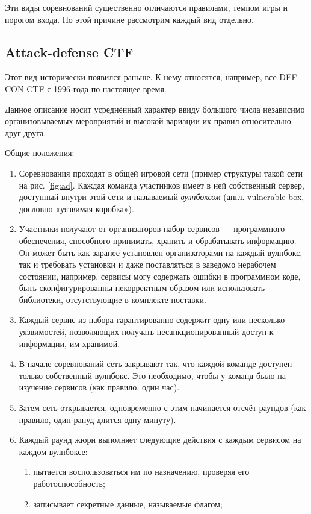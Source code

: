 Эти виды соревнований существенно отличаются правилами, темпом игры и порогом входа. По этой причине рассмотрим каждый вид отдельно.


\subsection{Attack-defense CTF}

Этот вид исторически появился раньше. К нему относятся, например, все DEF CON CTF с 1996 года по настоящее время.

Данное описание носит усреднённый характер ввиду большого числа независимо организовываемых мероприятий и высокой вариации их правил относительно друг друга.

Общие положения:
\begin{enumerate}
  \item Соревнования проходят в общей игровой сети (пример структуры такой сети на рис. \ref{fig:ad}. Каждая команда участников имеет в ней собственный сервер, доступный внутри этой сети и называемый \textit{вулнбоксом} (англ. vulnerable box, дословно «уязвимая коробка»).
  \item Участники получают от организаторов набор сервисов — программного обеспечения, способного принимать, хранить и обрабатывать информацию. Он может быть как заранее установлен организаторами на каждый вулнбокс, так и требовать установки и даже поставляться в заведомо нерабочем состоянии, например, сервисы могу содержать ошибки в программном коде, быть сконфигурированны некорректным образом или использовать библиотеки, отсутствующие в комплекте поставки.
  \item Каждый сервис из набора гарантированно содержит одну или несколько уязвимостей, позволяющих получать несанкционированный доступ к информации, им хранимой.
  \item В начале соревнований сеть закрывают так, что каждой команде доступен только собственный вулнбокс. Это необходимо, чтобы у команд было на изучение сервисов (как правило, один час).
  \item Затем сеть открывается, одновременно с этим начинается отсчёт раундов (как правило, один рануд длится одну минуту).
  \item Каждый раунд жюри выполняет следующие действия с каждым сервисом на каждом вулнбоксе:
    \begin{enumerate}
      \item пытается воспользоваться им по назначению, проверяя его работоспособность;
      \item записывает секретные данные, называемые флагом;

\end{enumerate}
\end{enumerate}
